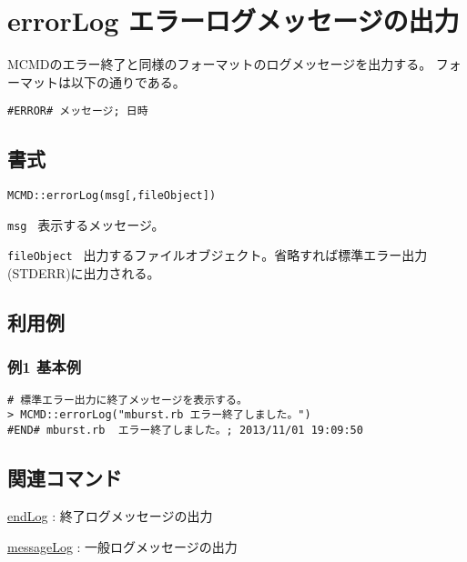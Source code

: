 
%

\section{errorLog エラーログメッセージの出力\label{sect:errorLog}}
MCMDのエラー終了と同様のフォーマットのログメッセージを出力する。
フォーマットは以下の通りである。

\begin{Verbatim}[baselinestretch=0.7,frame=single]
#ERROR# メッセージ; 日時
\end{Verbatim}


\subsection{書式}

{\large
\begin{verbatim}
MCMD::errorLog(msg[,fileObject])
\end{verbatim}
} 

\begin{description}
	\setlength{\itemindent}{-5mm}
	\item {\large \verb/msg /} 表示するメッセージ。
	\item {\large \verb/fileObject /} 出力するファイルオブジェクト。省略すれば標準エラー出力(STDERR)に出力される。
\end{description}

\subsection{利用例}
\subsubsection*{例1 基本例}

\begin{Verbatim}[baselinestretch=0.7,frame=single]
# 標準エラー出力に終了メッセージを表示する。
> MCMD::errorLog("mburst.rb エラー終了しました。")
#END# mburst.rb  エラー終了しました。; 2013/11/01 19:09:50
\end{Verbatim}

\subsection{関連コマンド}
\hyperref[sect:errorLogRB]{endLog} : 終了ログメッセージの出力

\hyperref[sect:messageRB]{messageLog} : 一般ログメッセージの出力

%

